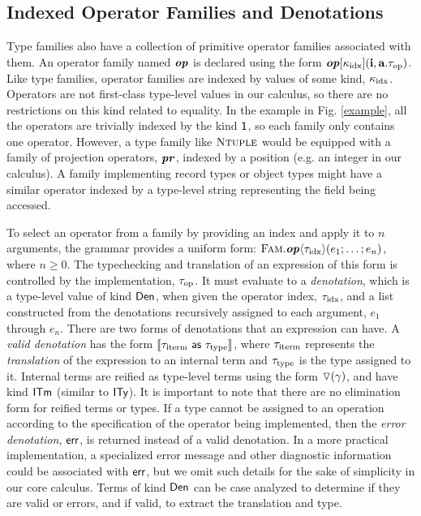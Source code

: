 \documentclass{llncs}
\begin{document}
\subsection{Indexed Operator Families and Denotations}\label{operators}
Type families also have a collection of primitive operator families associated with them. An operator family named $\textbf{\textit{op}}$ is declared using the form $\textbf{\textit{op}}[\kappa_{\text{idx}}]({\textbf{i}},{\textbf{a}}.{\tau_{\text{op}}})$. Like type families, operator families are indexed by values of some kind, $\kappa_{\text{idx}}$. Operators are not first-class type-level values in our calculus, so there are no restrictions on this kind related to equality. In the example in Fig. \ref{example}, all the operators are trivially indexed by the kind $\textsf{1}$, so each family only contains one operator. However, a type family like $\textsc{Ntuple}$ would be equipped with a family of projection operators, $\textbf{\textit{pr}}$, indexed by a position (e.g. an integer in our calculus). A family implementing record types or object types might have a similar operator indexed by a type-level string representing the field being accessed.

To select an operator from a family by providing an index and apply it to $n$ arguments, the grammar provides a uniform form: ${\textsc{Fam}.\textbf{\textit{op}}\langle{\tau_{\text{idx}}}\rangle(e_1; \ldots; e_n)}$, where $n \geq 0$. The typechecking and translation of an expression of this form is controlled by the implementation, ${\tau_{\text{op}}}$. It must evaluate to a \emph{denotation}, which is a type-level value of kind $\textsf{Den}$, when given the operator index, ${\tau_{\text{idx}}}$, and a list constructed from the denotations recursively assigned to each argument, $e_1$ through $e_n$. 
There are two forms of denotations that an expression can have. A \emph{valid denotation} has the form $\llbracket {\tau_{\text{iterm}}}~{\sf as}~{\tau_{\text{type}}} \rrbracket$, where ${\tau_{\text{iterm}}}$ represents the \emph{translation} of the expression to an internal term and ${\tau_{\text{type}}}$ is the type assigned to it. Internal terms are reified as type-level terms using the form $\triangledown(\gamma)$, and have kind $\textsf{ITm}$ (similar to $\textsf{ITy}$). It is important to note that there are no elimination form for reified terms or types.
If a type cannot be assigned to an operation according to the specification of the operator being implemented, then the \emph{error denotation}, ${\sf err}$, is returned instead of a valid denotation. In a more practical implementation, a specialized error message and other diagnostic information could be associated with ${\sf err}$, but we omit such details for the sake of simplicity in our core calculus. Terms of kind $\textsf{Den}$ can be \textsf{case} analyzed to determine if they are valid or errors, and if valid, to extract the translation and type.
\end{document}
